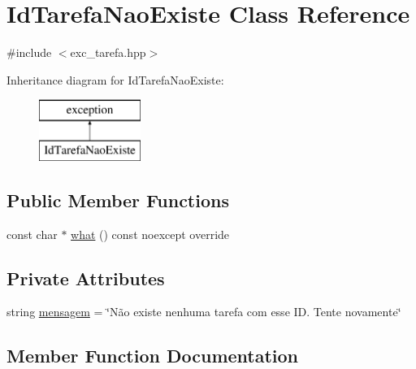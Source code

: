 \hypertarget{classIdTarefaNaoExiste}{}\section{Id\+Tarefa\+Nao\+Existe Class Reference}
\label{classIdTarefaNaoExiste}


{\ttfamily \#include $<$exc\+\_\+tarefa.\+hpp$>$}

Inheritance diagram for Id\+Tarefa\+Nao\+Existe\+:\begin{figure}[H]
\begin{center}
\leavevmode
\includegraphics[height=2.000000cm]{classIdTarefaNaoExiste}
\end{center}
\end{figure}
\subsection*{Public Member Functions}
\begin{DoxyCompactItemize}
\item 
const char $\ast$ \hyperlink{classIdTarefaNaoExiste_a0e69982b6d345fe04e5a18c60d1e10f6}{what} () const noexcept override
\end{DoxyCompactItemize}
\subsection*{Private Attributes}
\begin{DoxyCompactItemize}
\item 
string \hyperlink{classIdTarefaNaoExiste_a139ea7adf62da317199adb6c77fb95bf}{mensagem} = \char`\"{}Não existe nenhuma tarefa com esse I\+D. Tente novamente\char`\"{}
\end{DoxyCompactItemize}


\subsection{Member Function Documentation}
\mbox{\label{classIdTarefaNaoExiste_a0e69982b6d345fe04e5a18c60d1e10f6}} 
